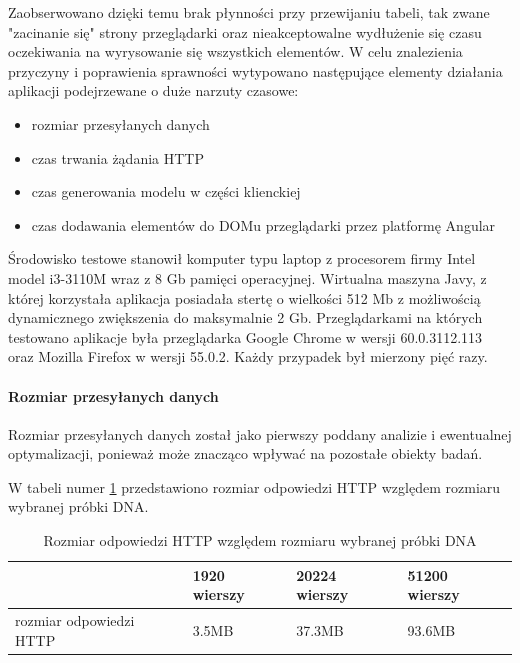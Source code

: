 \documentclass[a4paper,12pt,twoside]{article}
\begin{document}
Zaobserwowano dzięki temu brak płynności przy przewijaniu tabeli, tak zwane "zacinanie się" strony przeglądarki oraz nieakceptowalne wydłużenie się 
czasu oczekiwania na wyrysowanie się wszystkich elementów. 
W celu znalezienia przyczyny i poprawienia sprawności 
wytypowano następujące elementy działania aplikacji podejrzewane o duże narzuty czasowe:

\begin{itemize}
\item rozmiar przesyłanych danych
\item czas trwania żądania HTTP
\item czas generowania modelu w części klienckiej
\item czas dodawania elementów do DOMu przeglądarki przez platformę Angular
\end{itemize} 

Środowisko testowe stanowił komputer typu laptop z 
procesorem firmy Intel model i3-3110M wraz z 8 Gb pamięci operacyjnej.
Wirtualna maszyna Javy, z której korzystała aplikacja posiadała stertę
o wielkości 512 Mb z możliwością dynamicznego zwiększenia do maksymalnie 2 Gb.
Przeglądarkami na których testowano aplikacje była przeglądarka 
Google Chrome w wersji 60.0.3112.113 oraz Mozilla Firefox w wersji 55.0.2.
Każdy przypadek był mierzony pięć razy.  

\newpage
\paragraph{Rozmiar przesyłanych danych}
Rozmiar przesyłanych danych został jako pierwszy poddany analizie i
ewentualnej optymalizacji, ponieważ może znacząco wpływać na pozostałe 
obiekty badań.

W tabeli numer \ref{table:requestSizeNoOpt} przedstawiono rozmiar 
odpowiedzi HTTP względem rozmiaru wybranej próbki DNA.

\begin{center}
\begin{table} [H]
\begin{tabular}{| p{4cm} | p{2.7cm} | p{2.7cm} | p{2.7cm}|}
\hline
& 1920 wierszy &  20224 wierszy & 51200 wierszy\\ 
\hline
rozmiar odpowiedzi HTTP& 3.5MB&37.3MB& 93.6MB\\ \hline  
\end{tabular}

\caption{Rozmiar odpowiedzi HTTP względem rozmiaru wybranej próbki DNA}
\label{table:requestSizeNoOpt}
\end{table}
\end{center} 
\end{document}
